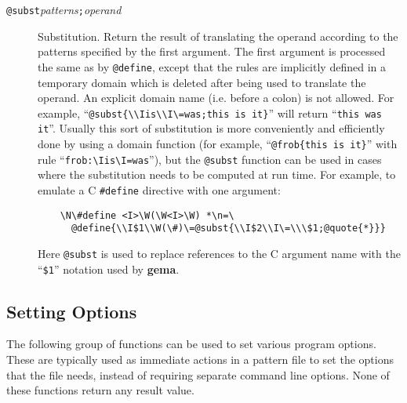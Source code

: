 \begin{description}
\item[{\tt @subst\ttlb}{\it patterns}{\tt ;}{\it operand}{\tt \ttrb}]
Substitution.
Return the result of translating the operand according to the patterns
specified by the first argument.
The first argument is processed the same as by \verb/@define/, except
that the rules are implicitly defined in a temporary domain which is
deleted after being used to translate the operand.  An explicit domain
name (i.e. before a colon) is not allowed.
For example, ``\verb/@subst{\\Iis\\I\=was;this is it}/'' will return
``\verb/this was it/''.
Usually this sort of substitution is more conveniently and efficiently
done by using a domain function (for example, ``\verb/@frob{this is it}/''
with rule ``\verb/frob:\Iis\I=was/''), but the \verb/@subst/ function
can be used in cases where the substitution needs to be computed at run
time.
For example, to emulate a C \verb/#define/ directive with one argument:
\begin{verbatim}
    \N\#define <I>\W(\W<I>\W) *\n=\
      @define{\\I$1\\W(\#)\=@subst{\\I$2\\I\=\\\$1;@quote{*}}}
\end{verbatim}
Here \verb/@subst/ is used to replace references to the C argument name
with the ``\verb/$1/'' notation used by {\bf gema}.
\end{description}

\subsection{Setting Options}
The following group of functions can be used to set various program
options.  These are typically used as immediate actions in a pattern
file to set the options that the file needs, instead of requiring
separate command line options.  None of these functions return any
result value.


